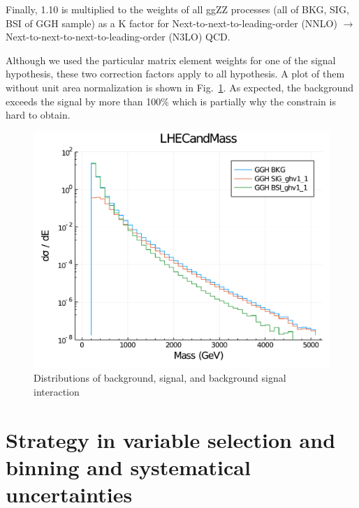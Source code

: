 Finally, 1.10 is multiplied to the weights of all ggZZ processes (all of BKG, SIG, BSI
of GGH sample) as a K factor for Next-to-next-to-leading-order (NNLO) $\rightarrow$ 
Next-to-next-to-next-to-leading-order (N3LO) QCD.

Although we used the particular matrix element weights for one of the signal hypothesis, these two
correction factors apply to all hypothesis. A plot of them without unit area normalization is shown
in Fig.~\ref{fig:bsi_sig_bkg_compare}. As expected, the background exceeds the signal by more than 100\%
which is partially why the constrain is hard to obtain.
\begin{figure}[htb]
    \begin{center}
        \includegraphics[width=.7\linewidth]{fig/LHE_integral_difference.pdf}
    \end{center}
    \caption{Distributions of background, signal, and background signal interaction}
    \label{fig:bsi_sig_bkg_compare}
\end{figure}
\section{Strategy in variable selection and binning and systematical uncertainties}

